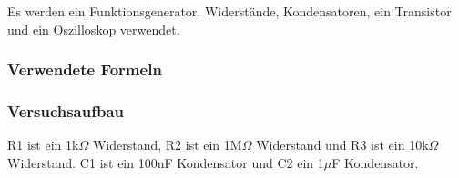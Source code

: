 \documentclass[12pt,a4paper]{article}
\begin{document}
Es werden ein Funktionsgenerator, Widerstände, Kondensatoren, ein Transistor und ein Oszilloskop verwendet.

\subsubsection{Verwendete Formeln}
\subsubsection{Versuchsaufbau}

R1 ist ein 1k$\Omega$ Widerstand, R2 ist ein 1M$\Omega$ Widerstand und R3 ist ein 10k$\Omega$ Widerstand. C1 ist ein 100nF Kondensator und C2 ein 1$\mu$F Kondensator.
\end{document}
